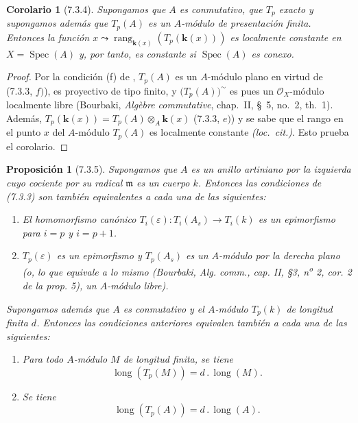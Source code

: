 \documentclass[10pt,oneside,openany]{book}
\theoremstyle{egaenv}\newtheorem*{env}{---}
\theoremstyle{egastatement}
\newtheorem*{proposition}{Proposición}
\newtheorem*{corollary}{Corolario}
\theoremstyle{egadescription}
\newcommand{\oldpage}[2][]{\marginnote{\normalfont\scriptsize\textbf{#1}\,|\,#2}\ignorespaces}
\begin{document}
\oldpage[III]{182}

\begin{corollary}[7.3.4]
\label{III.7.3.4}
Supongamos que $A$ es conmutativo, que $T_p$ exacto y supongamos además que $T_p(A)$ es un $A$-módulo de presentación finita. Entonces la
función
$x\leadsto\operatorname{rang}_{\mathbf{k}(x)}(T_p(\boldsymbol{k}(x)))$
es localmente constante en $X=\operatorname{Spec}(A)$ y, por tanto, es constante
si $\operatorname{Spec}(A)$ es conexo.
\end{corollary}

\begin{proof}
Por la condición (f) de , $T_p(A)$ es un
$A$-módulo plano en virtud de (7.3.3, $f)$), es
proyectivo de tipo finito, y $\bigl(T_p(A)\bigr)^{\sim}$ es pues un
$\mathscr O_X$-módulo localmente
libre (Bourbaki, \emph{Alg\`ebre commutative}, chap.~II, \S~5,
no.~2, th.~1). Además,
$T_p(\boldsymbol{k}(x))=T_p(A)\otimes_A\boldsymbol{k}(x)$
(7.3.3, $e)$) y se sabe que el rango en el punto $x$ del $A$-módulo $T_p(A)$ es localmente constante
\emph{(loc.\ cit.)}. Esto prueba el corolario.
\end{proof}

\begin{proposition}[7.3.5]
Supongamos que $A$ es un anillo artiniano por la izquierda cuyo cociente por su
radical $\mathfrak m$ es un cuerpo $k$. Entonces las condiciones de \textup{(7.3.3)} son
también equivalentes a cada una de las siguientes:
\begin{enumerate}
  \item[g)] El homomorfismo canónico
    $T_i(\varepsilon):T_i(A_s)\longrightarrow T_i(k)$
    es un epimorfismo para $i=p$ y $i=p+1$.
  \item[h)] $T_p(\varepsilon)$ es un epimorfismo y $T_p(A_s)$ es un
    $A$-módulo por la derecha plano \textup{(o, lo que equivale a lo mismo (Bourbaki,
    \emph{Alg. comm.}, cap. II, \S 3, n\textsuperscript{o} 2, cor. 2 de la
    prop. 5), un $A$-módulo} libre).
\end{enumerate}
Supongamos además que $A$ es conmutativo y el $A$-módulo $T_p(k)$ de
longitud finita $d$. Entonces las condiciones anteriores equivalen también a
cada una de las siguientes:
\begin{enumerate}
  \item[i)] Para todo $A$-módulo $M$ de longitud finita, se tiene
    \[
      \operatorname{long}(T_p(M))=d\mathbin{.}\operatorname{long}(M).
      \tag{7.3.5.1}\label{III.7.3.5.1.fr}
    \]
  \item[j)] Se tiene
    \[
      \operatorname{long}(T_p(A))=d\mathbin{.}\operatorname{long}(A).
      \tag{7.3.5.2}\label{III.7.3.5.2.fr}
    \]
\end{enumerate}
\end{proposition}
\end{document}
